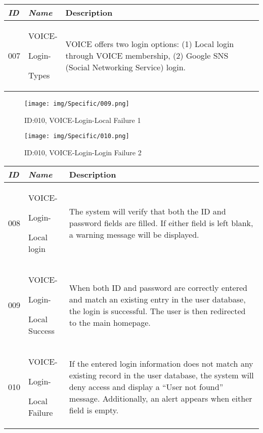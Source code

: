 \documentclass[conference]{IEEEtran}
\begin{document}
\begin{enumerate}[label=\arabic*]
    \vspace{2em}

    \begin{table}[h]
    \def\arraystretch{1.2} \small
        \begin{tabular}{|p{1cm}|p{1.8cm}|p{4.8cm}|}
        \hline
            \textit{\textbf{ID}} & \textit{\textbf{Name}} & {\textbf{Description}} \\
        \hline
            007 \par & VOICE-\par Login-\par Types & VOICE offers two login options: (1) Local login through VOICE membership, (2) Google SNS (Social Networking Service) login. \\
        \hline
        \end{tabular}
    \end{table}

    \newpage

    \begin{figure}[h]
        \centering
        \texttt{[image: img/Specific/009.png]}
        \caption{ID:010, VOICE-Login-Local Failure 1}
        \vspace{0.5cm}
        \texttt{[image: img/Specific/010.png]}
        \caption{ID:010, VOICE-Login-Login Failure 2}
    \end{figure}

    \begin{table}[h]
    \def\arraystretch{1.2} \small
        \begin{tabular}{|p{1cm}|p{1.8cm}|p{4.8cm}|}
        \hline
            \textit{\textbf{ID}} & \textit{\textbf{Name}} & {\textbf{Description}} \\
        \hline
            008 \par & VOICE-\par Login-\par Local login & The system will verify that both the ID and password fields are filled. If either field is left blank, a warning message will be displayed. \\
        \hline
            009 \par & VOICE-\par Login-\par Local Success & When both ID and password are correctly entered and match an existing entry in the user database, the login is successful. The user is then redirected to the main homepage. \\
        \hline
            010 \par & VOICE-\par Login-\par Local Failure & If the entered login information does not match any existing record in the user database, the system will deny access and display a “User not found” message. Additionally, an alert appears when either field is empty. \\
        \hline
        \end{tabular}
    \end{table}


\end{enumerate}
\end{document}
